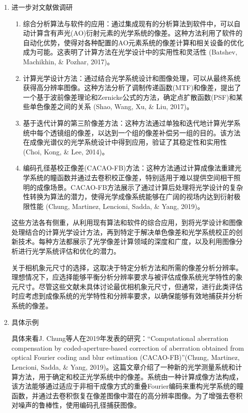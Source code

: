 \documentclass[dvipsnames, svgnames,a4paper,11pt]{article}
\begin{document}
\begin{enumerate}
		\item 进一步对文献做调研
		\begin{enumerate}
			\item 综合分析算法与软件的应用：通过集成现有的分析算法到软件中，可以自动计算含有声光(AO)衍射元素的光学系统的像差。这种方法利用了软件的自动化优势，使得对各种配置的AO元素系统的像差计算和相关设备的优化成为可能。这表明了计算方法在光学设计中的实用性和灵活性 (Batshev, Machikhin, \& Pozhar, 2017)。
			
			\item 计算光学设计方法：通过结合光学系统设计和图像处理，可以从最终系统获得高分辨率图像。这种方法分析了调制传递函数(MTF)和像差，提出了一个基于波前像差理论和Zernicke公式的方法，确定点扩散函数(PSF)和某些单色像差之间的关系 (Shao, Wang, Xu, \& Liu, 2017)。
			
			\item 基于迭代计算的第三阶像差方法：这种方法通过单独和迭代地计算光学系统中每个透镜组的像差，以达到一个组的像差补偿另一组的目的。该方法在成像光谱仪的光学系统设计中得到应用，验证了其稳定性和实用性 (Choi, Kong, \& Lee, 2014)。
			
			\item 编码孔径基校正像差(CACAO-FB)方法：这种方法通过计算成像法重建光学系统的瞳函数并通过去卷积校正像差，特别适用于难以提供空间相干照明的成像场景。CACAO-FB方法展示了通过计算后处理将光学设计的复杂性转换为算法的潜力，使得光学成像系统能够在广阔的视场内达到衍射极限性能 (Chung, Martinez, Lencioni, Sadda, \& Yang, 2019)。
		\end{enumerate}
		这些方法各有侧重，从利用现有算法和软件的综合应用，到将光学设计和图像处理结合的计算光学设计方法，再到特定于解决单色像差和光学系统校正的创新技术。每种方法都展示了光学像差计算领域的深度和广度，以及利用图像分析进行光学系统评估和优化的潜力。
		
		关于相机象元尺寸的选择，这取决于特定分析方法和所需的像差分析分辨率。理想情况下，应选择能够平衡分析分辨率要求与被评估成像系统光学特性的象元尺寸。尽管这些文献未具体讨论最优相机象元尺寸，但通常，进行此类评估时应考虑到成像系统的光学特性和分辨率要求，以确保能够有效地捕获并分析系统的像差。
		
		\item 具体示例
		
		具体来看J. Chung等人在2019年发表的研究：“Computational aberration compensation by coded-aperture-based correction of aberration obtained from optical Fourier coding and blur estimation (CACAO-FB)”(Chung, Martinez, Lencioni, Sadda, \& Yang, 2019)。这篇文章介绍了一种新的光学测量系统和计算方法，用于确定和校正光学系统中的像差。系统由一种计算成像方法构成，该方法能够通过适应于非相干成像方式的重叠Fourier编码来重构光学系统的瞳函数，并通过去卷积恢复在像差图像中潜在的高分辨率图像。为了增强去卷积对噪声的鲁棒性，使用编码孔径捕获图像。
		

\end{enumerate}
\end{document}
